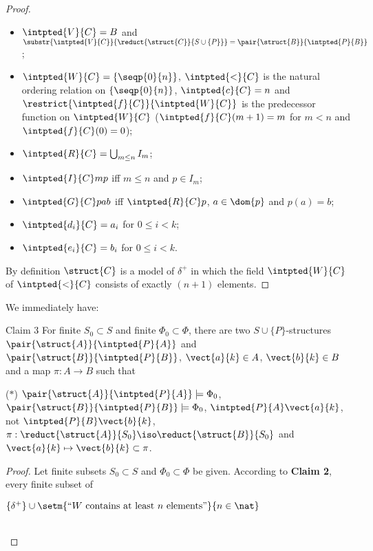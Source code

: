 \begin{enumerate}[1.]
\begin{proof}
\begin{itemize}
\item $\intpted{V}{C} = B$ and $\substr{\intpted{V}{C}}{\reduct{\struct{C}}{S \cup \{ P \}}} = \pair{\struct{B}}{\intpted{P}{B}}$;
\item $\intpted{W}{C} = \{ \seqp{0}{n} \}$, $\intpted{<}{C}$ is the natural ordering relation on $\{ \seqp{0}{n} \}$, $\intpted{c}{C} = n$ and $\restrict{\intpted{f}{C}}{\intpted{W}{C}}$ is the predecessor function on $\intpted{W}{C}$ ($\intpted{f}{C}(m + 1) = m$ for $m < n$ and $\intpted{f}{C}(0) = 0$);
\item $\intpted{R}{C} = \bigcup_{m \leq n} I_m$;
\item $\intpted{I}{C}mp$ \quad iff \quad $m \leq n$ and $p \in I_m$;
\item $\intpted{G}{C}pab$ \quad iff \quad $\intpted{R}{C}p$, $a \in \dom{p}$ and $p(a) = b$;
\item $\intpted{d_i}{C} = a_i$ for $0 \leq i < k$;
\item $\intpted{e_i}{C} = b_i$ for $0 \leq i < k$.
\end{itemize}
By definition $\struct{C}$ is a model of $\delta^+$ in which the field $\intpted{W}{C}$ of $\intpted{<}{C}$ consists of exactly $(n + 1)$ elements.
\end{proof}
We immediately have:\medskip\\
\begin{theorem}{Claim 3}
For finite $S_0 \subset S$ and finite $\Phi_0 \subset \Phi$, there are two $S \cup \{ P \}$-structures $\pair{\struct{A}}{\intpted{P}{A}}$ and $\pair{\struct{B}}{\intpted{P}{B}}$, $\vect{a}{k} \in A$, $\vect{b}{k} \in B$ and a map $\pi: A \to B$ such that\smallskip\\
\begin{bquoteno}{68ex}{{\rm($\ast$)}}
$\pair{\struct{A}}{\intpted{P}{A}} \models \Phi_0$, $\pair{\struct{B}}{\intpted{P}{B}} \models \Phi_0$, $\intpted{P}{A}\vect{a}{k}$, not $\intpted{P}{B}\vect{b}{k}$, $\pi: \reduct{\struct{A}}{S_0} \iso \reduct{\struct{B}}{S_0}$ and $\vect{a}{k} \mapsto \vect{b}{k} \subset \pi$.
\end{bquoteno}
\end{theorem}
\begin{proof}
Let finite subsets $S_0 \subset S$ and $\Phi_0 \subset \Phi$ be given. According to \textbf{Claim 2}, every finite subset of\smallskip\\
\centerline{$\{\delta^+\} \cup \setm{\mbox{``\(W\) contains at least \(n\) elements''}}{n \in \nat}$}\smallskip\\

\end{proof}
\end{enumerate}
